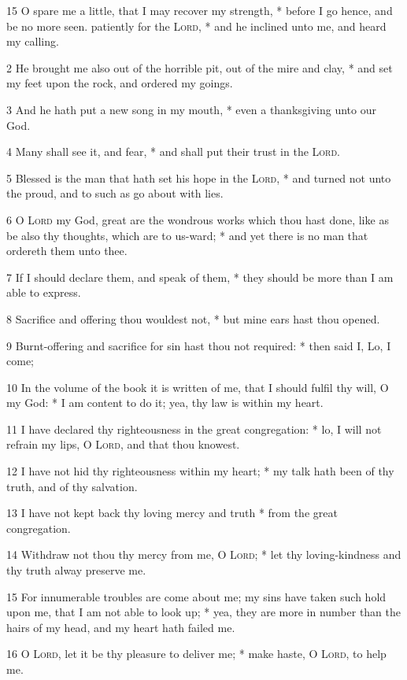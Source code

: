 15 O spare me a little, that I may recover my strength, * before I go hence, and be no more seen.
 patiently for the {\textsc{Lord}}, * and he inclined unto me, and heard my calling.\par
2 He brought me also out of the horrible pit, out of the mire and clay, * and set my feet upon the rock, and ordered my goings.\par
3 And he hath put a new song in my mouth, * even a thanksgiving unto our God.\par
4 Many shall see it, and fear, * and shall put their trust in the {\textsc{Lord}}.\par
5 Blessed is the man that hath set his hope in the {\textsc{Lord}}, * and turned not unto the proud, and to such as go about with lies.\par
6 O {\textsc{Lord}} my God, great are the wondrous works which thou hast done, like as be also thy thoughts, which are to us-ward; * and yet there is no man that ordereth them unto thee.\par
7 If I should declare them, and speak of them, * they should be more than I am able to express.\par
8 Sacrifice and offering thou wouldest not, * but mine ears hast thou opened.\par
9 Burnt-offering and sacrifice for sin hast thou not required: * then said I, Lo, I come;\par
10 In the volume of the book it is written of me, that I should fulfil thy will, O my God: * I am content to do it; yea, thy law is within my heart.\par
11 I have declared thy righteousness in the great congregation: * lo, I will not refrain my lips, O {\textsc{Lord}}, and that thou knowest.\par
12 I have not hid thy righteousness within my heart; * my talk hath been of thy truth, and of thy salvation.\par
13 I have not kept back thy loving mercy and truth * from the great congregation.\par
14 Withdraw not thou thy mercy from me, O {\textsc{Lord}}; * let thy loving-kindness and thy truth alway preserve me.\par
15 For innumerable troubles are come about me; my sins have taken such hold upon me, that I am not able to look up; * yea, they are more in number than the hairs of my head, and my heart hath failed me.\par
16 O {\textsc{Lord}}, let it be thy pleasure to deliver me; * make haste, O {\textsc{Lord}}, to help me.\par

